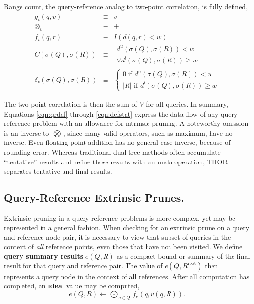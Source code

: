 \documentclass[twoside,leqno,twocolumn]{article}
\newcommand{\summary}{\delta}
\newcommand{\mysub}[1]{\subsection{#1.}}
\newcommand{\defterm}[1]{{\bf #1}}
\newcommand{\kdroot}[1]{#1^{\text{root}}}
\newcommand{\lo}[1]{#1^{l}}
\newcommand{\up}[1]{#1^{u}}
\newcommand{\distlo}{\lo{d}}
\newcommand{\distup}{\up{d}}
\newcommand{\dist}[2]{d(#1,#2)}
\newcommand{\nameOp}[2]{\mathop{#1\nolimits\!\!_{#2}}}
\newcommand{\nameop}[2]{#1_{\!#2}}
\newcommand{\myOp}[1]{\nameOp{\bigotimes}{#1}}
\newcommand{\myop}[1]{\nameop{\otimes}{#1}}
\newcommand{\letterqr}{v}
\newcommand{\outqr}{V}
\newcommand{\inqr}{v}
\newcommand{\Opqr}{\myOp{\letterqr}}
\newcommand{\opqr}{\myop{\letterqr}}
\newcommand{\fqr}{f_{\letterqr}}
\newcommand{\gqr}{g_{\letterqr}}
\newcommand{\letterqrv}{v}
\newcommand{\deltaqrv}{\summary_{\letterqrv}}
\newcommand{\canpruneqrv}{C}%
\newcommand{\lettermu}{e}
\newcommand{\inmu}{e}
\newcommand{\Outopmu}{\nameOp{\bigodot}{\lettermu}}%
\newcommand{\fmu}{f_{\lettermu}}
\newcommand{\outstat}{\sigma}
\begin{document}
\noindent
Range count, the query-reference analog to two-point correlation, is fully defined,
\begin{eqnarray*}
\gqr(q, \inqr) &\equiv& \inqr
\\
\opqr &\equiv& +
\\
\fqr(q,r) &\equiv& I(\dist{q}{r} < w)
\\
\canpruneqrv(\outstat(Q), \outstat(R))
&\equiv&
\begin{array}{l}\distup(\outstat(Q),\outstat(R)) < w \\ \vee \distlo(\outstat(Q),\outstat(R)) \geq w\end{array}
\\
\deltaqrv(\outstat(Q),\outstat(R)) &\equiv& \left\{ \begin{array}{l} 0 \text{ if } \distup(\outstat(Q),\outstat(R)) < w \\ |R| \text{ if } \distlo(\outstat(Q),\outstat(R)) \geq w \end{array}\right.
\end{eqnarray*}

\noindent
The two-point correlation is then the sum of $\outqr$ for all queries.
In summary, Equations \ref{eqn:qrdef} through \ref{eqn:defstat} express the data flow of any query-reference problem with an allowance for intrinsic pruning.
A noteworthy omission is an inverse to $\Opqr$, since many valid operators, such as maximum, have no inverse.
Even floating-point addition has no general-case inverse, because of rounding error.
Whereas traditional dual-tree methods often accumulate ``tentative'' results and refine those results with an undo operation, THOR separates tentative and final results.

\mysub{Query-Reference Extrinsic Prunes}

Extrinsic pruning in a query-reference problems is more complex, yet may be represented in a general fashion.
When checking for an extrinsic prune on a query and reference node pair, it is necessary to view that subset of queries in the context of {\em all} reference points, even those that have not been visited.
We define \defterm{query summary results} $\inmu(Q, R)$ as a compact bound or summary of the final result for that query and reference pair.
The value of $\inmu(Q, \kdroot{R})$ then represents a query node in the context of all references.
After all computation has completed, an \defterm{ideal} value may be computed,
\begin{equation*}
\inmu(Q, R) \gets \Outopmu_{q \in Q} \fmu(q, \inqr(q, R)).
\end{equation*}
\end{document}
